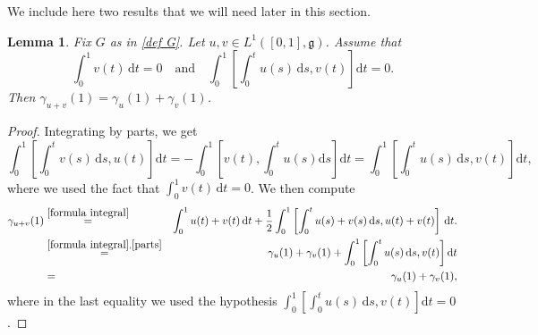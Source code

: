 \documentclass[a4paper,11pt,reqno]{amsart}
\theoremstyle{plain}
\newtheorem{lemma}[theorem]{Lemma}
\theoremstyle{definition}
\newcommand{\g}{\mathfrak{g}}
\newcommand{\de}{\mathrm{d}}
\begin{document}
We include here two results that we will need later in this section.

\begin{lemma} \label{lemma_wedge}
Fix $G$ as in \eqref{def G}.
	Let $u,v \in L^1([0,1],\g)$. Assume that 
	\begin{equation*} 
			\int^1_0 v(t) \, \de t = 0 \quad \text{and} \quad \int^1_0 \left[\int^t_0 u(s) \, \de s , v(t)\right] \de t = 0.
	\end{equation*}
	Then $\gamma_{u+v}(1)=\gamma_u(1) + \gamma_v(1)$.
\end{lemma}

\begin{proof}
Integrating by parts, we get
\begin{equation} \label{parts}
 \int^1_0 \left[\int^t_0 v(s) \, \de s , u(t)\right] \de t = - \int^1_0 \left[ v(t), \int^t_0 u(s) \de s \right] \de t = \int^1_0 \left[\int^t_0 u(s) \, \de s , v(t)\right] \de t,
\end{equation}
where we used the fact that $\int^1_0 v(t) \, \de t = 0$. We then compute
\begin{eqnarray*}
 \gamma_{u+v}(1) &\stackrel{\eqref{formula integral}}{=}& \int^1_0 u(t) +v(t) \, \de t + \frac{1}{2} \int^1_0 \left[\int^t_0 u(s) + v(s) \, \de s, u(t)+v(t) \right] \, \de t. \\
 &\stackrel{\eqref{formula integral},\eqref{parts}}{=}& \gamma_u(1) + \gamma_v(1) + \int^1_0 \left[\int^t_0 u(s) \, \de s , v(t)\right] \de t \\
 &=& \gamma_u(1) + \gamma_v(1),
\end{eqnarray*}
 where in the last equality we used the hypothesis $\int^1_0 \left[\int^t_0 u(s) \, \de s , v(t)\right] \de t = 0$.
\end{proof}
\end{document}
